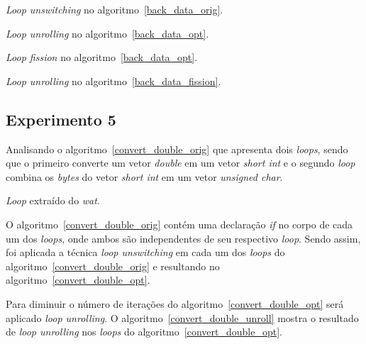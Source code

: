\begin{algorithm}[H]
\caption{\textit{Loop unswitching} no algoritmo~\ref{back_data_orig}.}
\label{back_data_opt}

\end{algorithm}


\begin{algorithm}[H]
\caption{\textit{Loop unrolling} no algoritmo~\ref{back_data_opt}.}
\label{back_data_unroll}

\end{algorithm}

\begin{algorithm}[H]
\caption{\textit{Loop fission} no algoritmo~\ref{back_data_opt}.}
\label{back_data_fission}

\end{algorithm}

\begin{algorithm}[H]
\caption{\textit{Loop unrolling} no algoritmo~\ref{back_data_fission}.}
\label{back_data_unrofis}

\end{algorithm}
\subsection{Experimento 5}

Analisando o algoritmo~\ref{convert_double_orig} que apresenta 
dois \textit{loops},
sendo que o primeiro converte um vetor \textit{double} em um vetor 
\textit{short int} e o segundo \textit{loop} combina os \textit{bytes} do vetor
\textit{short int} em um vetor \textit{unsigned char}.

\begin{algorithm}[H]
  \caption{\textit{Loop} extraído do \textit{wat}.}
\label{convert_double_orig}

\end{algorithm}

O algoritmo~\ref{convert_double_orig} contém uma declaração \textit{if} no corpo de
cada um dos \textit{loops}, onde ambos são independentes de seu respectivo \textit{loop}. 
Sendo assim, foi aplicada a técnica \textit{loop unswitching} em cada um dos
\textit{loops} do algoritmo~\ref{convert_double_orig} e resultando no
algoritmo~\ref{convert_double_opt}.

Para diminuir o número de iterações do algoritmo~\ref{convert_double_opt} será
aplicado \textit{loop unrolling}. O algoritmo~\ref{convert_double_unroll} mostra
o resultado de \textit{loop unrolling} nos \textit{loops} do
algoritmo~\ref{convert_double_opt}.

